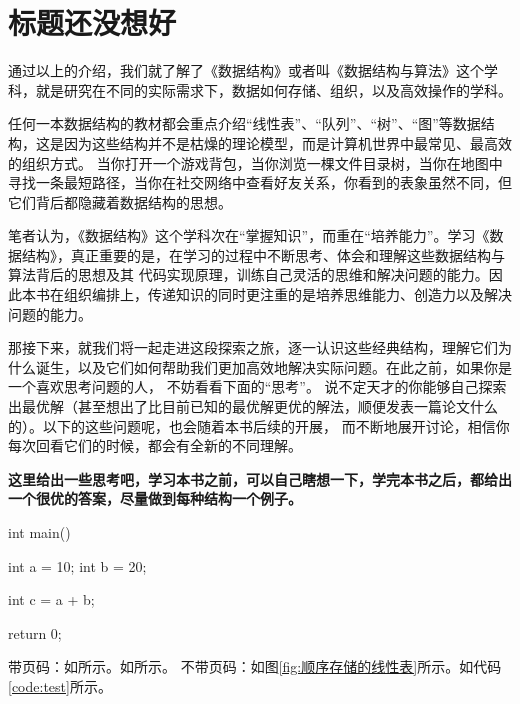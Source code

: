 \section{\textbf{标题还没想好}}
通过以上的介绍，我们就了解了《数据结构》或者叫《数据结构与算法》这个学科，就是研究在不同的实际需求下，数据如何存储、组织，以及高效操作的学科。

任何一本数据结构的教材都会重点介绍“线性表”、“队列”、“树”、“图”等数据结构，这是因为这些结构并不是枯燥的理论模型，而是计算机世界中最常见、最高效的组织方式。
当你打开一个游戏背包，当你浏览一棵文件目录树，当你在地图中寻找一条最短路径，当你在社交网络中查看好友关系，你看到的表象虽然不同，但它们背后都隐藏着数据结构的思想。

笔者认为，《数据结构》这个学科次在“掌握知识”，而重在“培养能力”。学习《数据结构》，真正重要的是，在学习的过程中不断思考、体会和理解这些数据结构与算法背后的思想及其
代码实现原理，训练自己灵活的思维和解决问题的能力。因此本书在组织编排上，传递知识的同时更注重的是培养思维能力、创造力以及解决问题的能力。

那接下来，就我们将一起走进这段探索之旅，逐一认识这些经典结构，理解它们为什么诞生，以及它们如何帮助我们更加高效地解决实际问题。在此之前，如果你是一个喜欢思考问题的人，
不妨看看下面的“思考”。
说不定天才的你能够自己探索出最优解（甚至想出了比目前已知的最优解更优的解法，顺便发表一篇论文什么的）。以下的这些问题呢，也会随着本书后续的开展，
而不断地展开讨论，相信你每次回看它们的时候，都会有全新的不同理解。
\begin{thinkbox}
{\color{red}\textbf{这里给出一些思考吧，学习本书之前，可以自己瞎想一下，学完本书之后，都给出一个很优的答案，尽量做到每种结构一个例子。}}
\end{thinkbox}


\begin{cppcodeNum}[label={code:test}, codetitle={测试代码}]

int main() {
    int a = 10;
    int b = 20;

    int c = a + b;

    return 0;
}

\end{cppcodeNum}

带页码：如所示。如所示。
不带页码：如图\ref{fig:顺序存储的线性表}所示。如代码\ref{code:test}所示。